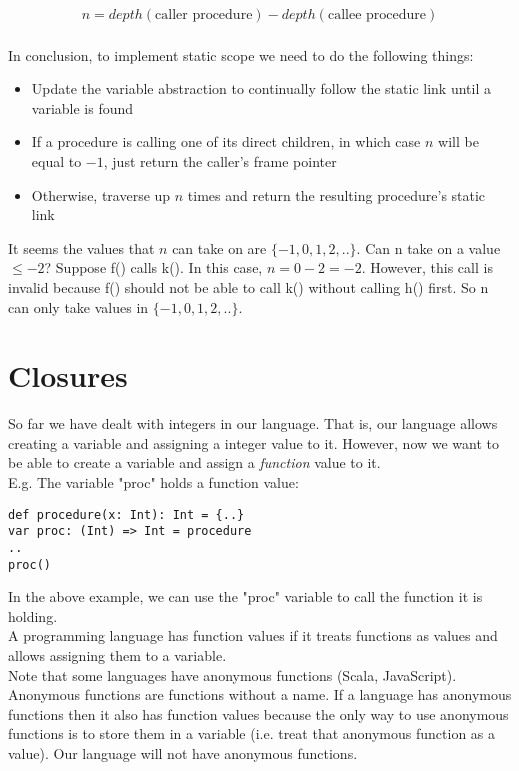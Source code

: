 \documentclass[12pt, letterpaper]{article}
\begin{document}
\begin{gather*}
n = depth(\text{caller procedure}) - depth(\text{callee procedure})
\end{gather*}\\

In conclusion, to implement static scope we need to do the following things:
\begin{itemize}
\item Update the variable abstraction to continually follow the static link until a variable is found
\item If a procedure is calling one of its direct children, in which case \(n\) will be equal to \(-1\), just return the caller's frame pointer
\item Otherwise, traverse up \(n\) times and return the resulting procedure's static link
\end{itemize}

It seems the values that \(n\) can take on are \(\{-1, 0, 1, 2, ..\}\). Can n take on a value \(\leq -2\)? Suppose f() calls k(). In this case, \(n = 0 - 2 = -2\). However, this call is invalid because f() should not be able to call k() without calling h() first. So n can only take values in \(\{-1, 0, 1, 2, ..\}\).

\newpage

\section{Closures}
So far we have dealt with integers in our language. That is, our language allows creating a variable and assigning a integer value to it. However, now we want to be able to create a variable and assign a \emph{function} value to it.\\

E.g. The variable "proc" holds a function value:
\begin{lstlisting}
def procedure(x: Int): Int = {..}
var proc: (Int) => Int = procedure
..
proc()
\end{lstlisting}

In the above example, we can use the "proc" variable to call the function it is holding.\\

A programming language has function values if it treats functions as values and allows assigning them to a variable.\\

Note that some languages have anonymous functions (Scala, JavaScript). Anonymous functions are functions without a name. If a language has anonymous functions then it also has function values because the only way to use anonymous functions is to store them in a variable (i.e. treat that anonymous function as a value). Our language will not have anonymous functions.\\
\end{document}
